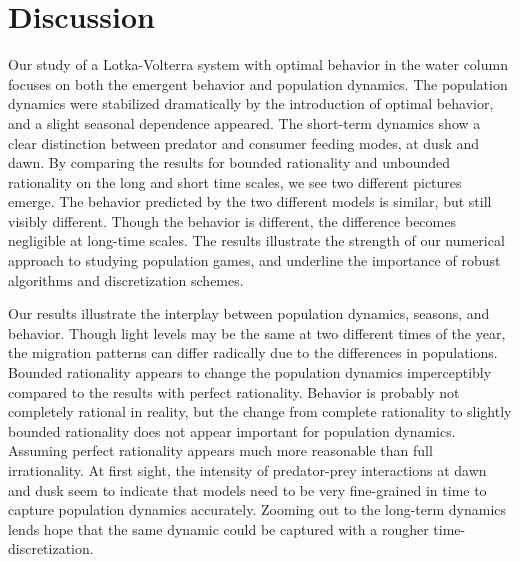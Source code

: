 \section{Discussion}

Our study of a Lotka-Volterra system with optimal behavior in the water column focuses on both the emergent behavior and population dynamics. The population dynamics were stabilized dramatically by the introduction of optimal behavior, and a slight seasonal dependence appeared. The short-term dynamics show a clear distinction between predator and consumer feeding modes,  at dusk and dawn. By comparing the results for bounded rationality and unbounded rationality on the long and short time scales, we see two different pictures emerge. The behavior predicted by the two different models is similar, but still visibly different. Though the behavior is different, the difference becomes negligible at long-time scales. The results illustrate the strength of our numerical approach to studying population games, and underline the importance of robust algorithms and discretization schemes.


Our results illustrate the interplay between population dynamics, seasons, and behavior. Though light levels may be the same at two different times of the year, the migration patterns can differ radically due to the differences in populations. Bounded rationality appears to change the population dynamics imperceptibly compared to the results with perfect rationality. Behavior is probably not completely rational in reality, but the change from complete rationality to slightly  bounded rationality does not appear important for population dynamics. Assuming perfect rationality appears much more reasonable than full irrationality. At first sight, the intensity of predator-prey interactions at dawn and dusk seem to indicate that models need to be very fine-grained in time to capture population dynamics accurately. Zooming out to the long-term dynamics lends hope that the same dynamic could be captured with a rougher time-discretization.


